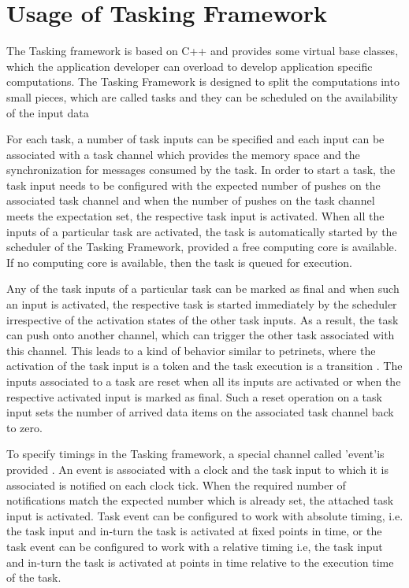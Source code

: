 \section{Usage of Tasking Framework}
The Tasking framework is based on C++ and provides some virtual base classes, which the application developer can overload to develop application specific computations. The Tasking Framework is designed to split the computations into small pieces, which are called tasks and they can be scheduled on the availability of the input data

For each task, a number of task inputs can be specified and each input can be associated with a task channel which provides the memory space and the synchronization for messages consumed by the task. In order to start a task, the task input needs to be configured with the expected number of pushes on the associated task channel and when the number of pushes on the task channel meets the expectation set, the respective task input is activated. When all the inputs of a particular task are activated, the task is automatically started by the scheduler of the Tasking Framework, provided a free computing core is available. If no computing core is available, then the task is queued for execution.

Any of the task inputs of a particular task can be marked as final and when such an input is activated, the respective task is started immediately by the scheduler irrespective of the activation states of the other task inputs. As a result, the task can push onto another channel, which can trigger the other task associated with this channel. This leads to a kind of behavior similar to petrinets, where the activation of the task input is a token and the task execution is a transition \cite{TaskFr}. The inputs associated to a task are reset when all its inputs are activated or when the respective activated input is marked as final. Such a reset operation on a task input sets the number of arrived data items on the associated task channel back to zero.

To specify timings in the Tasking framework, a special channel called 'event'is provided \cite{TaskFr}. An event is associated with a clock and the task input to which it is associated is notified on each clock tick. When the required number of notifications match the expected number which is already set, the attached task input is activated. Task event can be configured to work with absolute timing, i.e. the task input and in-turn the task is activated at fixed points in time, or the task event can be configured to work with a relative timing i.e, the task input and in-turn the task is activated at points in time relative to the execution time of the task.

